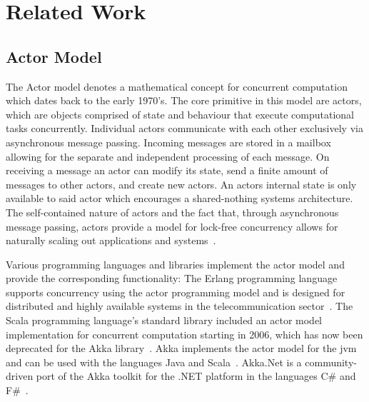 
\section{Related Work}

  \subsection{Actor Model}
  The Actor model denotes a mathematical concept for concurrent computation which dates back to the early 1970's.
  The core primitive in this model are actors, which are objects comprised of state and behaviour that execute computational tasks concurrently.
  Individual actors communicate with each other exclusively via asynchronous message passing.
  Incoming messages are stored in a mailbox allowing for the separate and independent processing of each message.
  On receiving a message an actor can modify its state, send a finite amount of messages to other actors, and create new actors.
  An actors internal state is only available to said actor which encourages a shared-nothing systems architecture.
  The self-contained nature of actors and the fact that, through asynchronous message passing, actors provide a model for lock-free concurrency allows for naturally scaling out applications and systems~\cite{vernon2015reactive}.

  Various programming languages and libraries implement the actor model and provide the corresponding functionality:
  The Erlang programming language supports concurrency using the actor programming model and is designed for distributed and highly available systems in the telecommunication sector~\cite{armstrong:erlang}.
  The Scala programming language's standard library included an actor model implementation for concurrent computation starting in 2006, which has now been deprecated for the Akka library~\cite{Haller:2012}.
  Akka implements the actor model for the \gls{jvm} and can be used with the languages Java and Scala~\cite{akka}.
  Akka.Net is a community-driven port of the Akka toolkit for the .NET platform in the languages C\# and F\#~\cite{akka.net}.

